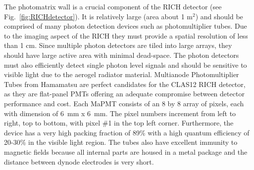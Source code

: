 The photomatrix  wall is a crucial component of the RICH detector (see Fig.~\ref{fig:RICHdetector}). It is relatively large (area about 1 m$^2$) and should be comprised of many photon detection devices such as photomultiplier tubes.
Due to the imaging aspect of the RICH they must provide a spatial resolution of less than 1 cm.
Since multiple photon detectors are tiled into large arrays, they should have large active area with minimal dead-space.
The photon detectors must also efficiently detect single photon level signals and should be sensitive to visible light due to the aerogel radiator material.
Multianode Photomultiplier Tubes from Hamamatsu are perfect candidates for the CLAS12 RICH detector, as they are flat-panel PMTs offering an adequate compromise between detector performance and cost.
Each MaPMT consists of an 8 by 8 array of pixels, each with dimension of 6~mm x 6~mm.
The pixel numbers increment from left to right, top to bottom, with pixel \#1 in the top left corner.
Furthermore, the device has a very high packing fraction of 89\% with a high quantum efficiency of 20-30\% in the visible light region.
The tubes also have excellent immunity to magnetic fields because all internal parts are housed in a metal package and the distance between dynode electrodes is very short.


